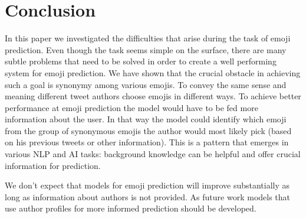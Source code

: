 \documentclass[10pt, a4paper]{article}
\begin{document}
\section{Conclusion}

In this paper we investigated the difficulties that arise during the task of 
emoji prediction. Even though the task seems simple on the surface, there are 
many subtle problems that need to be solved in order to create a well performing
system for emoji prediction. We have shown that the crucial obstacle in 
achieving such a goal is synonymy among various emojis. To convey the same sense
and meaning different tweet authors choose emojis in different ways. To achieve 
better performance at emoji prediction the model would have to be fed more 
information about the user. In that way the model could identify which emoji 
from the group of synonymous emojis the author would most likely pick (based on 
his previous tweets or other information). This is a pattern that emerges in 
various NLP and AI tasks: background knowledge can be helpful and offer crucial 
information for prediction.

We don't expect that models for emoji prediction will improve substantially as 
long as information about authors is not provided. As future work models that 
use author profiles for more informed prediction should be developed.



 
\end{document}
